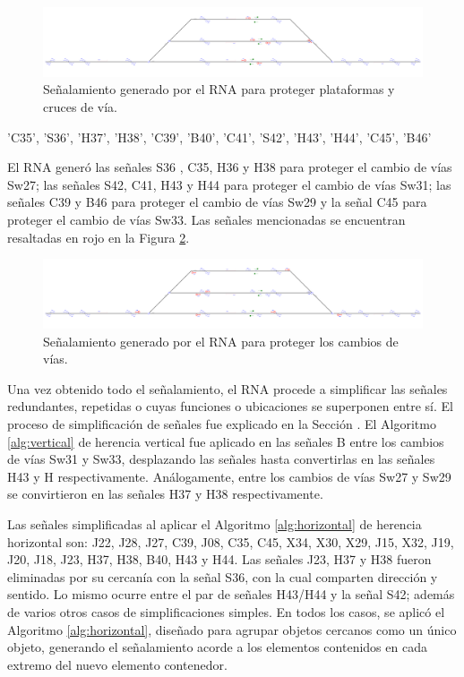 \begin{figure}[H]
	\centering
	\includegraphics[width=1\textwidth]{resultados-obtenidos/ejemplo9/images/9_step3.png}
	\centering\caption{Señalamiento generado por el RNA para proteger plataformas y cruces de vía.}
	\label{fig:EJ9_5}
\end{figure}

'C35', 'S36', 'H37', 'H38', 'C39', 'B40', 'C41', 'S42', 'H43', 'H44', 'C45', 'B46'

El RNA generó las señales S36 , C35, H36 y H38 para proteger el cambio de vías Sw27; las señales S42, C41, H43 y H44 para proteger el cambio de vías Sw31; las señales C39 y B46 para proteger el cambio de vías Sw29 y la señal C45 para proteger el cambio de vías Sw33. Las señales mencionadas se encuentran resaltadas en rojo en la Figura \ref{fig:EJ9_6}.

\begin{figure}[H]
	\centering
	\includegraphics[width=1\textwidth]{resultados-obtenidos/ejemplo9/images/9_step4.png}
	\centering\caption{Señalamiento generado por el RNA para proteger los cambios de vías.}
	\label{fig:EJ9_6}
\end{figure}

Una vez obtenido todo el señalamiento, el RNA procede a simplificar las señales redundantes, repetidas o cuyas funciones o ubicaciones se superponen entre sí. El proceso de simplificación de señales fue explicado en la Sección \label{sec:simplificacion}. El Algoritmo \ref{alg:vertical} de herencia vertical fue aplicado en las señales B entre los cambios de vías Sw31 y Sw33, desplazando las señales hasta convertirlas en las señales H43 y H respectivamente. Análogamente, entre los cambios de vías Sw27 y Sw29 se convirtieron en las señales H37 y H38 respectivamente.

Las señales simplificadas al aplicar el Algoritmo \ref{alg:horizontal} de herencia horizontal son: J22, J28, J27, C39, J08, C35, C45, X34, X30, X29, J15, X32, J19, J20, J18, J23, H37, H38, B40, H43 y H44. Las señales J23, H37 y H38 fueron eliminadas por su cercanía con la señal S36, con la cual comparten dirección y sentido. Lo mismo ocurre entre el par de señales H43/H44 y la señal S42; además de varios otros casos de simplificaciones simples. En todos los casos, se aplicó el Algoritmo \ref{alg:horizontal}, diseñado para agrupar objetos cercanos como un único objeto, generando el señalamiento acorde a los elementos contenidos en cada extremo del nuevo elemento contenedor.

